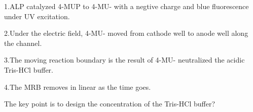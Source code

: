 \documentclass{article}
\begin{document}
1.ALP catalyzed 4-MUP to 4-MU- with a negtive charge and blue fluorescence under UV excitation.

2.Under the electric field, 4-MU- moved from cathode well to anode well along the channel.

3.The moving reaction boundary is the result of 4-MU- neutralized the acidic Tris-HCl buffer.

4.The MRB removes in linear as the time goes.

The key point is to design the concentration of the Tris-HCl buffer?
\end{document}
